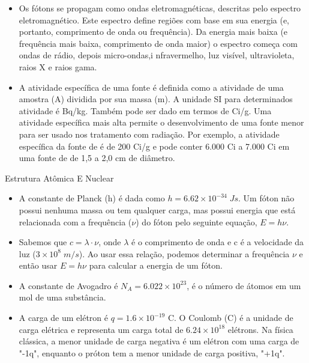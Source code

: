 \documentclass[11pt,a4paper]{article}
\newcounter{exemplo}
\begin{document}
\begin{exemplo}
\begin{itemize}
        \item Os fótons se propagam como ondas eletromagnéticas, descritas pelo espectro eletromagnético. Este espectro define regiões com base em sua energia (e, portanto, comprimento de onda ou frequência). Da energia mais baixa (e frequência mais baixa, comprimento de onda maior) o espectro começa com ondas de rádio, depois micro-ondas,i nfravermelho, luz visível, ultravioleta, raios X e raios gama.

        \item A atividade específica de uma fonte é definida como a atividade de uma amostra (A) dividida por sua massa (m). A unidade SI para determinados atividade é Bq/kg. Também pode ser dado em termos de  Ci/g. Uma atividade específica mais alta permite o desenvolvimento de uma fonte menor para ser usado nos tratamento com radiação. Por exemplo, a atividade específica da fonte de  é de 200 Ci/g e pode conter 6.000 Ci a 7.000 Ci em uma fonte de  de 1,5 a 2,0 cm de diâmetro.
        
    \end{itemize}

    \textcolor{CarnationPink}{Estrutura Atômica E Nuclear}
    \begin{itemize}
        \item A constante de Planck (h) é dada como $h = 6.62 \times 10^{-34} \; J s$. Um fóton não possui nenhuma massa ou tem qualquer carga, mas possui energia que está relacionada com a frequência ($\nu$) do fóton pelo seguinte equação, $E = h\nu$.
        
        \item Sabemos que $c = \lambda \cdot \nu$, onde $\lambda$ é o comprimento de onda e c é a velocidade da luz ($3 \times 10^{8} \; m/s$). Ao usar essa relação, podemos determinar a frequência $\nu$ e então usar $E = h \nu$ para calcular a energia de um fóton.
        
        \item A constante de Avogadro é $N_A = 6.022 \times 10^{23}$, é o número de átomos em um mol de uma substância.
        
        \item A carga de um elétron é $q = 1.6 \times 10^{-19}$ C. O Coulomb (C) é a unidade de carga elétrica e representa um carga total de $6.24 \times 10^{18}$ elétrons. Na física clássica, a menor unidade de carga negativa é um elétron com uma carga de "-1q", enquanto o próton tem a menor unidade de carga positiva, "+1q". 


\end{itemize}
\end{exemplo}
\end{document}
